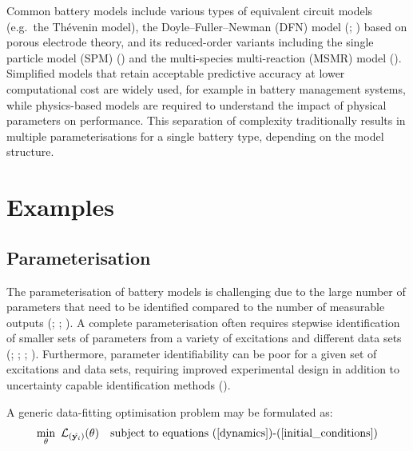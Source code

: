 \documentclass[
]{article}
\begin{document}
Common battery models include various types of equivalent circuit models
(e.g.~the Thévenin model), the Doyle--Fuller--Newman (DFN) model
(;
) based on porous
electrode theory, and its reduced-order variants including the single
particle model (SPM) () and the multi-species multi-reaction (MSMR) model
(). Simplified
models that retain acceptable predictive accuracy at lower computational
cost are widely used, for example in battery management systems, while
physics-based models are required to understand the impact of physical
parameters on performance. This separation of complexity traditionally
results in multiple parameterisations for a single battery type,
depending on the model structure.

\section{Examples}\label{examples}

\subsection{Parameterisation}\label{parameterisation}

The parameterisation of battery models is challenging due to the large
number of parameters that need to be identified compared to the number
of measurable outputs (; ;
). A complete
parameterisation often requires stepwise identification of smaller sets
of parameters from a variety of excitations and different data sets
(;
; ; ). Furthermore,
parameter identifiability can be poor for a given set of excitations and
data sets, requiring improved experimental design in addition to
uncertainty capable identification methods
().

A generic data-fitting optimisation problem may be formulated as:
\begin{equation}
\min_{\mathbf{\theta}} ~ \mathcal{L}_{(\hat{\mathbf{y}_i})}(\mathbf{\theta}) ~~~
\textrm{subject to equations (\ref{dynamics})\textrm{-}(\ref{initial_conditions})}
\label{eqn:parameterisation}
\end{equation}
\end{document}
